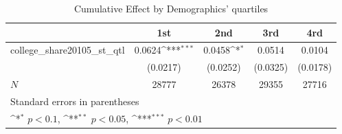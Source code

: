 \begin{table}[htbp]\centering
\def\sym#1{\ifmmode^{#1}\else\(^{#1}\)\fi}
\caption{Cumulative Effect by Demographics' quartiles}
\begin{tabular}{l*{4}{c}}
\hline\hline
            &\multicolumn{1}{c}{1st}&\multicolumn{1}{c}{2nd}&\multicolumn{1}{c}{3rd}&\multicolumn{1}{c}{4rd}\\
\hline
college\_share20105\_st\_qtl&      0.0624\sym{***}&      0.0458\sym{*}  &      0.0514         &      0.0104         \\
            &    (0.0217)         &    (0.0252)         &    (0.0325)         &    (0.0178)         \\
\hline
\(N\)       &       28777         &       26378         &       29355         &       27716         \\
\hline\hline
\multicolumn{5}{l}{\footnotesize Standard errors in parentheses}\\
\multicolumn{5}{l}{\footnotesize \sym{*} \(p<0.1\), \sym{**} \(p<0.05\), \sym{***} \(p<0.01\)}\\
\end{tabular}
\end{table}
